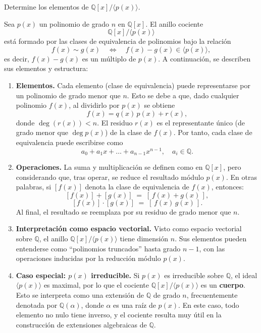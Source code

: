 Determine los elementos de \( \mathbb{Q}[x] / \langle p(x) \rangle \).

Sea \(p(x)\) un polinomio de grado \(n\) en \(\mathbb{Q}[x]\). El anillo cociente 
\[
\mathbb{Q}[x]/\langle p(x)\rangle
\]
está formado por las clases de equivalencia de polinomios bajo la relación
\[
f(x) \sim g(x) \quad \Longleftrightarrow \quad f(x) - g(x) \in \langle p(x)\rangle,
\]
es decir, \(f(x) - g(x)\) es un múltiplo de \(p(x)\). A continuación, se describen sus elementos y estructura:

\begin{enumerate}
    \item \textbf{Elementos.} 
    Cada elemento (clase de equivalencia) puede representarse por un polinomio de grado menor que \(n\). 
    Esto se debe a que, dado cualquier polinomio \(f(x)\), al dividirlo por \(p(x)\) se obtiene
    \[
    f(x) = q(x)\,p(x) + r(x),
    \]
    donde \(\deg(r(x)) < n\). 
    El residuo \(r(x)\) es el representante único (de grado menor que \(\deg p(x)\)) de la clase de \(f(x)\). 
    Por tanto, cada clase de equivalencia puede escribirse como
    \[
    a_0 + a_1x + \dots + a_{n-1}x^{n-1}, \quad a_i\in \mathbb{Q}.
    \]

    \item \textbf{Operaciones.} 
    La suma y multiplicación se definen como en \(\mathbb{Q}[x]\), pero considerando que, 
    tras operar, se reduce el resultado módulo \(p(x)\). 
    En otras palabras, si \([f(x)]\) denota la clase de equivalencia de \(f(x)\), entonces:
    \[
    [f(x)] + [g(x)] \;=\; [\,f(x) + g(x)\,],
    \]
    \[
    [f(x)] \cdot [g(x)] \;=\; [\,f(x)\,g(x)\,].
    \]
    Al final, el resultado se reemplaza por su residuo de grado menor que \(n\).

    \item \textbf{Interpretación como espacio vectorial.} 
    Visto como espacio vectorial sobre \(\mathbb{Q}\), el anillo \(\mathbb{Q}[x]/\langle p(x)\rangle\) 
    tiene dimensión \(n\). Sus elementos pueden entenderse como “polinomios truncados” hasta grado \(n-1\), 
    con las operaciones inducidas por la reducción módulo \(p(x)\).

    \item \textbf{Caso especial: \(p(x)\) irreducible.} 
    Si \(p(x)\) es irreducible sobre \(\mathbb{Q}\), el ideal \(\langle p(x)\rangle\) es maximal, 
    por lo que el cociente \(\mathbb{Q}[x]/\langle p(x)\rangle\) es un \textbf{cuerpo}. 
    Esto se interpreta como una extensión de \(\mathbb{Q}\) de grado \(n\), frecuentemente denotada por 
    \(\mathbb{Q}(\alpha)\), donde \(\alpha\) es una raíz de \(p(x)\). 
    En este caso, todo elemento no nulo tiene inverso, y el cociente resulta muy útil en la construcción 
    de extensiones algebraicas de \(\mathbb{Q}\).
\end{enumerate}

